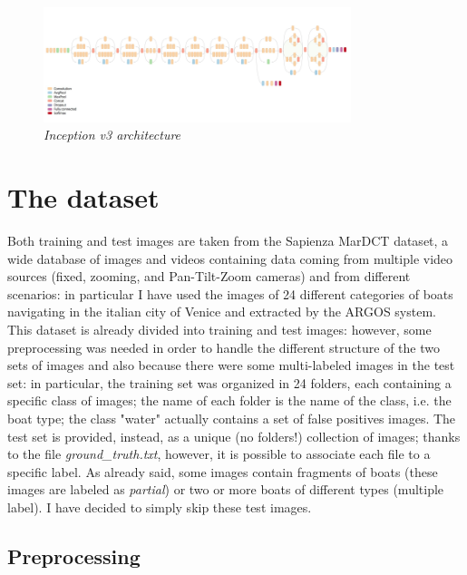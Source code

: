 \documentclass[12pt]{article}
\begin{document}
\begin{figure}[!ht]
	\centering 
	\includegraphics[width=0.8\textwidth]{inceptionv3.png} 
	\caption{\textit{Inception v3 architecture}} 
	\label{fig:inceptionv3}
\end{figure}

\section{The dataset}
\label{sec:dataset}
Both training and test images are taken from the Sapienza MarDCT dataset, a wide database of images and videos containing data coming from multiple video sources (fixed, zooming, and Pan-Tilt-Zoom cameras) and from different scenarios: in particular I have used the images of 24 different categories of boats navigating in the italian city of Venice and extracted by the ARGOS system. This dataset is already divided into training and test images: however, some preprocessing was needed in order to handle the different structure of the two sets of images and also because there were some multi-labeled images in the test set: in particular, the training set was organized in 24 folders, each containing a specific class of images; the name of each folder is the name of the class, i.e. the boat type; the class "water" actually contains a set of false positives images. The test set is provided, instead, as a unique (no folders!) collection of images; thanks to the file \textit{ground\_truth.txt}, however, it is possible to associate each file to a specific label. As already said, some images contain fragments of boats (these images are labeled as \textit{partial}) or two or more boats of different types (multiple label). I have decided to simply skip these test images.

\subsection{Preprocessing}
\label{sec:preprocessing}
\end{document}
